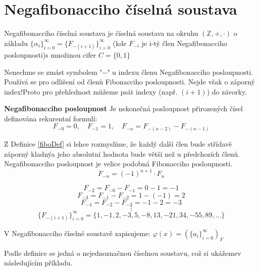 \documentclass[czech,bachelor,dept470,male]{diploma}
\newcommand{\poslalpha}{\{\alpha_i\}_{i=0}^{\infty}}
\newcommand{\posla}{\{a_i\}_{i=0}^{\infty}}
\begin{document}
\section{Negafibonacciho číselná soustava}
\begin{definition}
	Negafibonacciho číselná soustava je číselná soustava na okruhu $(\mathbb{Z},+,\cdot)$ o základu $\poslalpha = \{F_{-(i+1)}\}_{i=0}^{\infty}$ (kde $F_{-i}$ je i-tý člen Negafibonacciho posloupnosti)\newline s množinou cifer $C=\{0,1\}$
\end{definition}
\begin{remark}
	Nenechme se zmást symbolem \textbf{'$-$'} u indexu členu Negafibonacciho posloupnosti. Používá se pro odlišení od členů Fibonacciho posloupnosti. Nejde však o záporný index!\newline Proto pro přehlednost můžeme psát indexy (např. $(i+1)$) do závorky.
\end{remark}
\begin{definition}\label{fiboDef} \textbf{Negafibonacciho posloupnost}\newline
	Je nekonečná posloupnost přirozených čísel definována rekurentní formulí:
	$$F_{-0} = 0,\quad F_{-1} = 1,\quad F_{-n} = F_{-(n-2)} - F_{-(n-1)}$$
\end{definition}
Z Definice \ref{fiboDef} si lehce rozmyslíme, že každý další člen bude střídavě záporný kladný\newline a jeho absolutní hodnota bude větší než u předchozích členů.\newline
Negafibonacciho posloupnost je velice podobná Fibonacciho posloupnosti.
$$F_{-n} = (-1)^{n+1}\cdot F_n$$
\begin{example}
	$$F_{-2} = F_{-0} - F_{-1} = 0 - 1 = -1$$$$F_{-3 }= F_{-1}-F_{-2} = 1-(-1)=2$$$$F_{-4} = F_{-2} - F_{-3} = -1 -2 = -3$$$$\vdots$$
	$$ \{F_{-(i+1)}\}_{i=0}^{\infty} = \{1,-1,2,-3,5,-8,13,-21,34,-55,89,\dots\}$$
\end{example}
\begin{agreement}
	V Negafibonacciho číselné soustavě zapisujeme:
	$\varphi(x) = (\posla)_F$\newline
\end{agreement}
\begin{remark}
	Podle definice se jedná o nejednoznačnou číselnou soustavu, což si ukážeme\newline v následujícím příkladu.
\end{remark}\newpage
\end{document}
